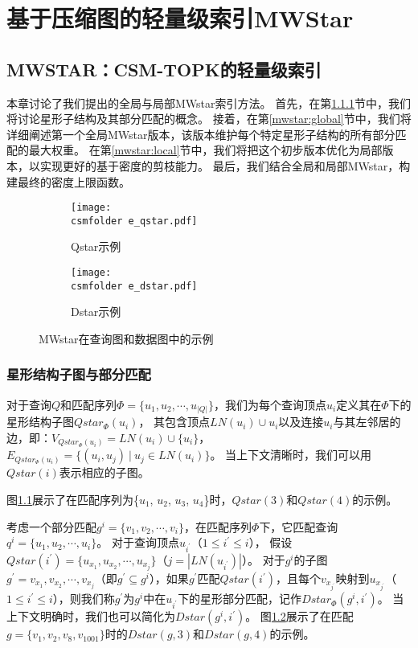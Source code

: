 \chapter{基于压缩图的轻量级索引MWStar}
\label{ch4}
\section{MWSTAR：CSM-TOPK的轻量级索引}
本章讨论了我们提出的全局与局部MWstar索引方法。
首先，在第\ref{mwstar:star_subquery}节中，我们将讨论星形子结构及其部分匹配的概念。
接着，在第\ref{mwstar:global}节中，我们将详细阐述第一个全局MWstar版本，该版本维护每个特定星形子结构的所有部分匹配的最大权重。
在第\ref{mwstar:local}节中，我们将把这个初步版本优化为局部版本，以实现更好的基于密度的剪枝能力。
最后，我们结合全局和局部MWstar，构建最终的密度上限函数。

\begin{figure}[h!]
\def\wscorevone{0.48}
\centering
\begin{subfigure}[t]{\wscorevone\linewidth}
\centering
\resizebox{\linewidth}{!}
{
\texttt{[image: \\csmfolder e\_qstar.pdf]}
}
\caption{Qstar示例}
\label{fig:qstar}
\end{subfigure}
\begin{subfigure}[t]{\wscorevone\linewidth}
\centering
\resizebox{\linewidth}{!}
{
\texttt{[image: \\csmfolder e\_dstar.pdf]}
}
\caption{Dstar示例}
\label{fig:dstar}
\end{subfigure}
\caption{MWstar在查询图和数据图中的示例}
\label{fig:exp:mwstar}
\end{figure}

\subsection{星形结构子图与部分匹配}
\label{mwstar:star_subquery}

\begin{definition}[星形结构子图]\label{def:star-subquery}
对于查询$Q$和匹配序列$\Phi=\{u_1, u_2, \cdots, u_{|Q|} \}$，我们为每个查询顶点$u_i$定义其在$\Phi$下的星形结构子图$Qstar_{\Phi}(u_i)$，
其包含顶点$LN(u_i) \cup {u_i}$以及连接$u_i$与其左邻居的边，即：$V_{Qstar_{\Phi}(u_i)} = LN(u_i) \cup \{u_i\}$，$E_{Qstar_{\Phi}(u_i)} = \{(u_i, u_j)\ |\ u_j\in LN(u_i)\}$。
当上下文清晰时，我们可以用$Qstar(i)$表示相应的子图。
\end{definition}

图\ref{fig:qstar}展示了在匹配序列为\{$u_1$, $u_2$, $u_3$, $u_4$\}时，$Qstar(3)$和$Qstar(4)$的示例。

考虑一个部分匹配$g^i=\{v_1, v_2, \cdots, v_i\}$，在匹配序列$\Phi$下，它匹配查询$q^i=\{u_1, u_2, \cdots, u_{i}\}$。
对于查询顶点$u_{i^\prime}$（$1 \leq i^\prime \leq i$），
假设$Qstar(i^\prime) = \{u_{x_1}, u_{x_2}, \cdots, u_{x_j}\}$（$j = |LN(u_{i^\prime})|$）。
对于$g^i$的子图$g^\prime = {v_{x_1}, v_{x_2}, \cdots, v_{x_j}}$（即$g^\prime \subseteq g^i$），如果$g^\prime$匹配$Qstar(i^\prime)$，且每个$v_{x_{j^\prime}}$映射到$u_{x_{j^\prime}}$（$1 \leq i^\prime \leq i$），则我们称$g^\prime$为$g^i$中在$u_{i^\prime}$下的星形部分匹配，记作$Dstar_{\Phi}(g^i, i^\prime)$。
当上下文明确时，我们也可以简化为$Dstar(g^i, i^\prime)$。
图\ref{fig:dstar}展示了在匹配$g=\{v_1, v_2, v_8, v_{1001}\}$时的$Dstar(g, 3)$和$Dstar(g, 4)$的示例。

